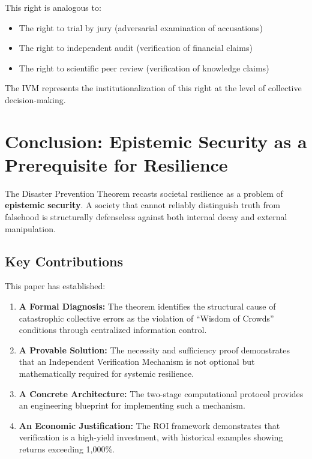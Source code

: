 \documentclass[11pt,a4paper]{article}
\begin{document}
\begin{small}
This right is analogous to:
\begin{itemize}
    \item The right to trial by jury (adversarial examination of accusations)
    \item The right to independent audit (verification of financial claims)
    \item The right to scientific peer review (verification of knowledge claims)
\end{itemize}

The IVM represents the institutionalization of this right at the level of collective decision-making.

\section{Conclusion: Epistemic Security as a Prerequisite for Resilience}

The Disaster Prevention Theorem recasts societal resilience as a problem of \textbf{epistemic security}. A society that cannot reliably distinguish truth from falsehood is structurally defenseless against both internal decay and external manipulation.

\subsection{Key Contributions}

This paper has established:

\begin{enumerate}
    \item \textbf{A Formal Diagnosis:} The theorem identifies the structural cause of catastrophic collective errors as the violation of ``Wisdom of Crowds'' conditions through centralized information control.
    
    \item \textbf{A Provable Solution:} The necessity and sufficiency proof demonstrates that an Independent Verification Mechanism is not optional but mathematically required for systemic resilience.
    
    \item \textbf{A Concrete Architecture:} The two-stage computational protocol provides an engineering blueprint for implementing such a mechanism.
    
    \item \textbf{An Economic Justification:} The ROI framework demonstrates that verification is a high-yield investment, with historical examples showing returns exceeding 1,000\%.
    

\end{enumerate}
\end{small}
\end{document}
